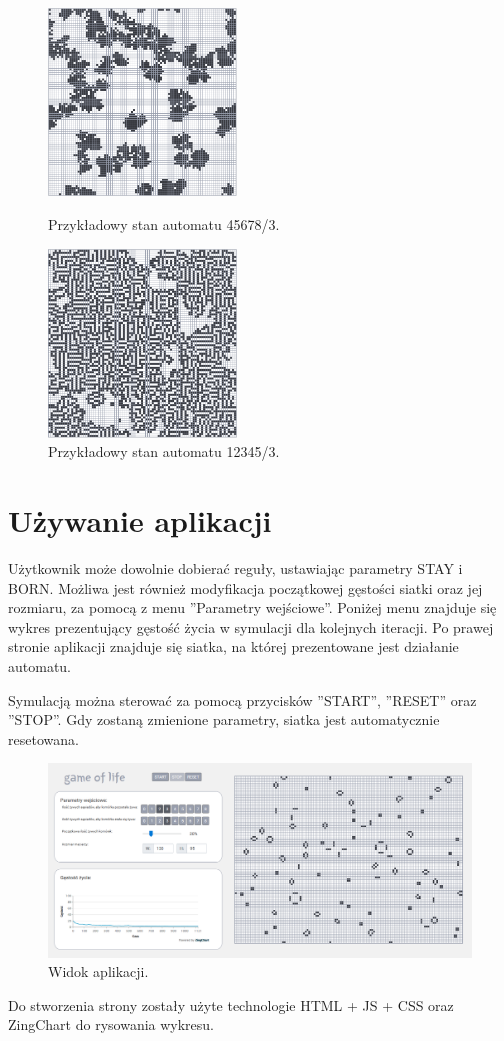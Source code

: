 \documentclass[12pt]{article}
\begin{document}
\begin{figure}[H]
\centering
\parbox{5cm}{
\includegraphics[width=5cm]{koralowiec.png}
\caption{Przykładowy stan automatu 45678/3.}
\label{fig:2figsA}}
\qquad
\begin{minipage}{5cm}
\includegraphics[width=5cm]{maze.png}
\caption{Przykładowy stan automatu 12345/3.}
\label{fig:2figsB}
\end{minipage}
\end{figure}

\section{Używanie aplikacji}
Użytkownik może dowolnie dobierać reguły, ustawiając parametry STAY i BORN. Możliwa jest również modyfikacja początkowej gęstości siatki oraz jej rozmiaru, za pomocą z menu ''Parametry wejściowe''. Poniżej menu znajduje się wykres prezentujący gęstość życia w symulacji dla kolejnych iteracji. Po prawej stronie aplikacji znajduje się siatka, na której prezentowane jest działanie automatu.

Symulacją można sterować za pomocą przycisków ''START'', ''RESET'' oraz ''STOP''. Gdy zostaną zmienione parametry, siatka jest automatycznie resetowana.

\begin{figure}[H]
\centering
\includegraphics[width=14cm]{strona.png}
\caption{Widok aplikacji.}
\end{figure}

Do stworzenia strony zostały użyte technologie HTML + JS + CSS oraz ZingChart do rysowania wykresu.
\end{document}

